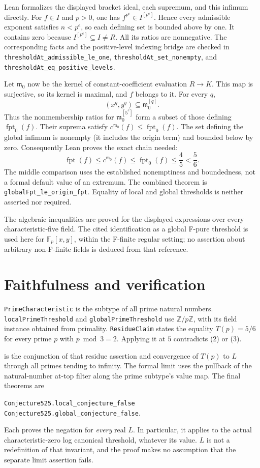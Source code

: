\documentclass[11pt,a4paper]{article}
\newcommand{\lean}[1]{\nolinkurl{#1}}
\newcommand{\code}[1]{\texttt{\detokenize{#1}}}
\newcommand{\F}{\mathbb F}
\newcommand{\fpt}{\operatorname{fpt}}
\newcommand{\origin}{\mathfrak m_0}
\begin{document}
Lean formalizes the displayed bracket ideal, each supremum, and this
infimum directly. For $f\in I$ and $p>0$, one has
$f^{p^e}\in I^{[p^e]}$. Hence every admissible exponent satisfies
$n<p^e$, so each defining set is bounded above by one. It contains zero
because $I^{[p^e]}\subseteq I\ne R$. All its ratios are nonnegative.
The corresponding facts and the positive-level indexing bridge are
checked in \lean{thresholdAt_admissible_le_one},
\lean{thresholdAt_set_nonempty}, and
\lean{thresholdAt_eq_positive_levels}.

Let $\origin$ now be the kernel of constant-coefficient evaluation
$R\to K$. This map is surjective, so its kernel is maximal, and $f$
belongs to it. For every $q$,
\[
 (x^q,y^q)\subseteq\origin^{[q]}.
\]
Thus the nonmembership ratios for $\origin^{[5^e]}$ form a subset of
those defining $\fpt_0(f)$. Their suprema satisfy
$c^{\origin}(f)\le\fpt_0(f)$. The set defining the global infimum is
nonempty (it includes the origin term) and bounded below by zero.
Consequently Lean proves the exact chain needed:
\[
 \fpt(f)\le c^{\origin}(f)\le\fpt_0(f)\le\frac45<\frac56.
 \tag{3}
\]
The middle comparison uses the established nonemptiness and boundedness,
not a formal default value of an extremum. The combined theorem is
\lean{globalFpt_le_origin_fpt}. Equality of local and global thresholds
is neither asserted nor required.

The algebraic inequalities are proved for the displayed expressions over
every characteristic-five field. The cited identification as a global
F-pure threshold is used here for $\F_p[x,y]$, within the F-finite
regular setting; no assertion about arbitrary non-F-finite fields is
deduced from that reference.

\newpage
\section{Faithfulness and verification}
\lean{PrimeCharacteristic} is the subtype of all prime natural numbers.
\lean{localPrimeThreshold} and \lean{globalPrimeThreshold} use
$\mathbb Z/p\mathbb Z$, with its field instance obtained from primality.
\lean{ResidueClaim} states the equality $T(p)=5/6$ for every prime
$p$ with $p\bmod3=2$. Applying it at $5$ contradicts (2) or (3).

\code{ConjectureAt T L} is the conjunction of that residue assertion
and convergence of $T(p)$ to $L$ through all primes tending to infinity.
The formal limit uses the pullback of the natural-number at-top filter
along the prime subtype's value map. The final theorems are
\begin{center}
\lean{Conjecture525.local_conjecture_false}\\[3pt]
\lean{Conjecture525.global_conjecture_false}.
\end{center}
Each proves the negation for \emph{every} real $L$. In particular, it
applies to the actual characteristic-zero log canonical threshold,
whatever its value. $L$ is not a redefinition of that invariant, and the
proof makes no assumption that the separate limit assertion fails.
\end{document}
